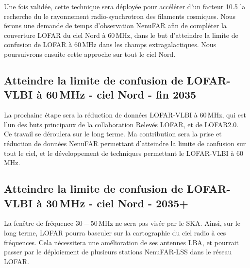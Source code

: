 \pg
Une fois valid\'ee, cette technique sera d\'eploy\'ee pour acc\'el\'erer d'un facteur 10.5 la recherche du le rayonnement radio-synchrotron des filaments cosmiques. Nous ferons une demande de temps d'observation NenuFAR afin de compl\'eter la couverture LOFAR du ciel Nord \`a 60\,MHz, dans le but d'atteindre la limite de confusion de LOFAR \`a 60\,MHz dans les champs extragalactiques. Nous poursuivrons ensuite cette approche sur tout le ciel Nord. %

\subsection{Atteindre la limite de confusion de LOFAR-VLBI \`a 60\,MHz - ciel Nord - fin 2035}

\pg
La prochaine \'etape sera la r\'eduction de donn\'ees LOFAR-VLBI \`a 60\,MHz, qui est l'un des buts principaux de la collaboration Relev\'es LOFAR, et de LOFAR2.0. Ce travail se d\'eroulera sur le long terme. Ma contribution sera la prise et r\'eduction de donn\'ees NenuFAR permettant d'atteindre la limite de confusion sur tout le ciel, et le d\'eveloppement de techniques permettant le LOFAR-VLBI \`a 60\,MHz.


\subsection{Atteindre la limite de confusion de LOFAR-VLBI \`a 30\,MHz - ciel Nord - 2035+}

\pg
La fen\^etre de fr\'equence $30-50$\,MHz ne sera pas vis\'ee par le SKA. Ainsi, sur le long terme, LOFAR pourra basculer sur la cartographie du ciel radio \`a ces fr\'equences. Cela n\'ecessitera une am\'elioration de ses antennes LBA, et pourrait passer par le d\'eploiement de plusieurs stations NenuFAR-LSS dans le r\'eseau LOFAR. 

%
%
%	
%

